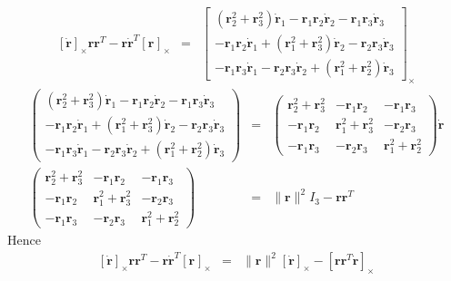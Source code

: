\documentclass {article}
\newcommand\rot{\mathbf{r}}
\newcommand\rcross[1]{[\rot_{#1}]_{\times}}
\newcommand\rdotcross{\left[\dot{\rot}\right]_{\times}}
\newcommand\normr{\|\rot\|}
\begin{document}
\begin{eqnarray*}
\rdotcross\rot\rot^T-\rot\dot{\rot}^T\rcross{}&=&
\left[\begin{array}{c}
(\rot_2^2+\rot_3^2)\dot{\rot}_1-\rot_1\rot_2\dot{\rot}_2-\rot_1\rot_3\dot{\rot}_3\\
-\rot_1\rot_2\dot{\rot}_1+(\rot_1^2+\rot_3^2)\dot{\rot}_2-\rot_2\rot_3\dot{\rot}_3\\
-\rot_1\rot_3\dot{\rot}_1-\rot_2\rot_3\dot{\rot}_2+(\rot_1^2+\rot_2^2)\dot{\rot}_3\end{array}\right]_{\times}
\end{eqnarray*}
\begin{eqnarray*}
\left(\begin{array}{c}
(\rot_2^2+\rot_3^2)\dot{\rot}_1-\rot_1\rot_2\dot{\rot}_2-\rot_1\rot_3\dot{\rot}_3\\
-\rot_1\rot_2\dot{\rot}_1+(\rot_1^2+\rot_3^2)\dot{\rot}_2-\rot_2\rot_3\dot{\rot}_3\\
-\rot_1\rot_3\dot{\rot}_1-\rot_2\rot_3\dot{\rot}_2+(\rot_1^2+\rot_2^2)\dot{\rot}_3\end{array}\right) &=&
\left(\begin{array}{ccc}
\rot_2^2+\rot_3^2&-\rot_1\rot_2&-\rot_1\rot_3\\
-\rot_1\rot_2&\rot_1^2+\rot_3^2&-\rot_2\rot_3\\
-\rot_1\rot_3&-\rot_2\rot_3&\rot_1^2+\rot_2^2\end{array}\right) \dot{\rot}\\
\left(\begin{array}{ccc}
\rot_2^2+\rot_3^2&-\rot_1\rot_2&-\rot_1\rot_3\\
-\rot_1\rot_2&\rot_1^2+\rot_3^2&-\rot_2\rot_3\\
-\rot_1\rot_3&-\rot_2\rot_3&\rot_1^2+\rot_2^2\end{array}\right) &=& \normr^2 I_3 - \rot\rot^T
\end{eqnarray*}
Hence
\begin{eqnarray}\label{eq:ouf}
\rdotcross\rot\rot^T-\rot\dot{\rot}^T\rcross{}&=&
\normr^2\rdotcross - \left[\rot\rot^T\dot{\rot}\right]_{\times}
\end{eqnarray}
\end{document}
